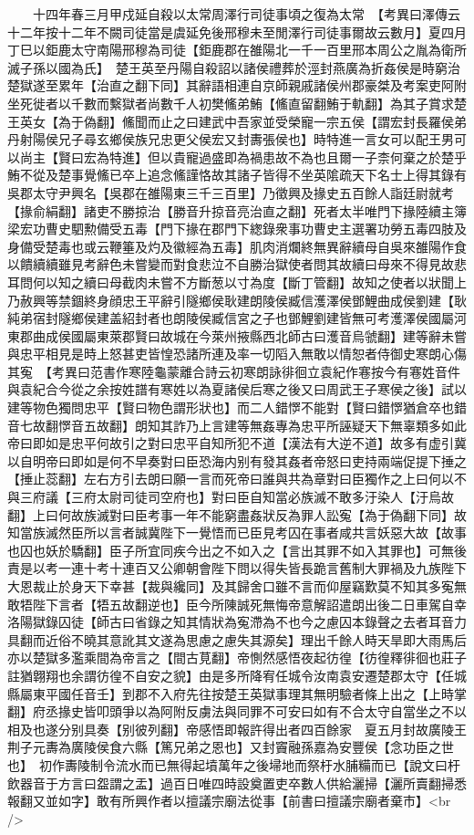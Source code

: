 　　十四年春三月甲戍延自殺以太常周澤行司徒事頃之復為太常　【考異曰澤傳云十二年按十二年不闕司徒當是虞延免後邢穆未至閒澤行司徒事爾故云數月】夏四月丁巳以鉅鹿太守南陽邢穆為司徒【鉅鹿郡在雒陽北一千一百里邢本周公之胤為衛所滅子孫以國為氏】　楚王英至丹陽自殺詔以諸侯禮葬於涇封燕廣為折姦侯是時窮治楚獄遂至累年【治直之翻下同】其辭語相連自京師親戚諸侯州郡豪桀及考案吏阿附坐死徙者以千數而繫獄者尚數千人初樊鯈弟鮪【鯈直留翻鮪于軌翻】為其子賞求楚王英女【為于偽翻】鯈聞而止之曰建武中吾家並受榮寵一宗五侯【謂宏封長羅侯弟丹射陽侯兄子尋玄鄉侯族兄忠更父侯宏又封夀張侯也】時特進一言女可以配王男可以尚主【賢曰宏為特進】但以貴寵過盛即為禍患故不為也且爾一子柰何棄之於楚乎鮪不從及楚事覺鯈已卒上追念鯈謹恪故其諸子皆得不坐英隂疏天下名士上得其錄有吳郡太守尹興名【吳郡在雒陽東三千三百里】乃徵興及掾史五百餘人詣廷尉就考【掾俞絹翻】諸吏不勝掠治【勝音升掠音亮治直之翻】死者太半唯門下掾陸續主簿梁宏功曹史駟勲備受五毒【門下掾在郡門下緫錄衆事功曹史主選署功勞五毒四肢及身備受楚毒也或云鞭箠及灼及徽經為五毒】肌肉消爛終無異辭續母自吳來雒陽作食以饋續續雖見考辭色未嘗變而對食悲泣不自勝治獄使者問其故續曰母來不得見故悲耳問何以知之續曰母截肉未嘗不方斷葱以寸為度【斷丁管翻】故知之使者以狀聞上乃赦興等禁錮終身顔忠王平辭引隧鄉侯耿建朗陵侯臧信濩澤侯鄧鯉曲成侯劉建【耿純弟宿封隧鄉侯建盖紹封者也朗陵侯臧信宮之子也鄧鯉劉建皆無可考濩澤侯國屬河東郡曲成侯國屬東萊郡賢曰故城在今萊州掖縣西北師古曰濩音烏虢翻】建等辭未嘗與忠平相見是時上怒甚吏皆惶恐諸所連及率一切䧟入無敢以情恕者侍御史寒朗心傷其寃　【考異曰范書作寒陸龜蒙離合詩云初寒朗詠徘徊立袁紀作寋按今有寋姓音件與袁紀合今從之余按姓譜有寒姓以為夏諸侯后寒之後又曰周武王子寒侯之後】試以建等物色獨問忠平【賢曰物色謂形狀也】而二人錯㦍不能對【賢曰錯㦍猶倉卒也錯音七故翻㦍音五故翻】朗知其詐乃上言建等無姦專為忠平所誣疑天下無辜類多如此帝曰即如是忠平何故引之對曰忠平自知所犯不道【漢法有大逆不道】故多有虚引冀以自明帝曰即如是何不早奏對曰臣恐海内别有發其姦者帝怒曰吏持兩端促提下捶之【捶止蕊翻】左右方引去朗曰願一言而死帝曰誰與共為章對曰臣獨作之上曰何以不與三府議【三府太尉司徒司空府也】對曰臣自知當必族滅不敢多汙染人【汙烏故翻】上曰何故族滅對曰臣考事一年不能窮盡姦狀反為罪人訟寃【為于偽翻下同】故知當族滅然臣所以言者誠冀陛下一覺悟而已臣見考囚在事者咸共言妖惡大故【故事也囚也妖於驕翻】臣子所宜同疾今出之不如入之【言出其罪不如入其罪也】可無後責是以考一連十考十連百又公卿朝會陛下問以得失皆長跪言舊制大罪禍及九族陛下大恩裁止於身天下幸甚【裁與纔同】及其歸舍口雖不言而仰屋竊歎莫不知其多寃無敢牾陛下言者【牾五故翻逆也】臣今所陳誠死無悔帝意解詔遣朗出後二日車駕自幸洛陽獄錄囚徒【師古曰省錄之知其情狀為寃滯為不也今之慮囚本錄聲之去者耳音力具翻而近俗不曉其意訛其文遂為思慮之慮失其源矣】理出千餘人時天旱即大雨馬后亦以楚獄多濫乘間為帝言之【間古莧翻】帝惻然感悟夜起彷徨【彷徨釋徘徊也莊子註猶翺翔也余謂彷徨不自安之貌】由是多所降宥任城令汝南袁安遷楚郡太守【任城縣屬東平國任音壬】到郡不入府先往按楚王英獄事理其無明驗者條上出之【上時掌翻】府丞掾史皆叩頭爭以為阿附反虜法與同罪不可安曰如有不合太守自當坐之不以相及也遂分别具奏【别彼列翻】帝感悟即報許得出者四百餘家　夏五月封故廣陵王荆子元夀為廣陵侯食六縣【篤兄弟之恩也】又封竇融孫嘉為安豐侯【念功臣之世也】　初作夀陵制令流水而已無得起墳萬年之後埽地而祭杅水脯糒而已【說文曰杅飲器音于方言曰盌謂之盂】過百日唯四時設奠置吏卒數人供給灑掃【灑所賣翻掃悉報翻又並如字】敢有所興作者以擅議宗廟法從事【前書曰擅議宗廟者棄市】<br />
